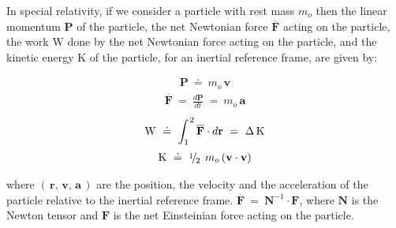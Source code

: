 \documentclass[10pt,fleqn]{article}
\newcommand{\med}{\raise.5ex\hbox{$\scriptstyle 1$}\kern-.15em/\kern-.12em\lower.45ex\hbox{$\scriptstyle 2$}\;}
\begin{document}
\noindent In special relativity, if we consider a particle with rest mass $m_o$ then the linear momentum $\mathbf{P}$ of the particle, the net Newtonian force $\mathbf{\overline{F}}$ acting on the particle, the work $\mathrm{W}$ done by the net Newtonian force acting on the particle, and the kinetic energy $\mathrm{K}$ of the particle, for an inertial reference frame, are given by:
\par \vspace{-0.30em}
\begin{eqnarray*}
\mathbf{P} ~\doteq~ m_o \, \mathbf{v}
\end{eqnarray*}
\vspace{-0.30em}
\begin{eqnarray*}
\mathbf{\overline{F}} ~=~ \frac{d\mathbf{P}}{d{t}} ~=~ m_o \, \mathbf{a}
\end{eqnarray*}
\vspace{-0.30em}
\begin{eqnarray*}
\mathrm{W} ~\doteq~ \int_1^{\hspace{+0.06em}2} \mathbf{\overline{F}} \cdot d{\mathbf{r}} ~=~ \Delta \, \mathrm{K}
\end{eqnarray*}
\vspace{-0.30em}
\begin{eqnarray*}
\mathrm{K} ~\doteq~ \med \, m_o \, ( \mathbf{v} \cdot \mathbf{v} )
\end{eqnarray*}
\par \vspace{+0.90em}
\noindent where $( \, \mathbf{r}, \, \mathbf{v}, \, \mathbf{a} \, )$ are the position, the velocity and the acceleration of the particle relative to the inertial reference frame. {\small $\mathbf{\overline{F}} ~=~ \mathbf{N}^{-1} \cdot \mathbf{F}$}, where {\small $\mathbf{N}$} is the Newton tensor and {\small $\mathbf{F}$} is the net Einsteinian force acting on the particle.
\end{document}
